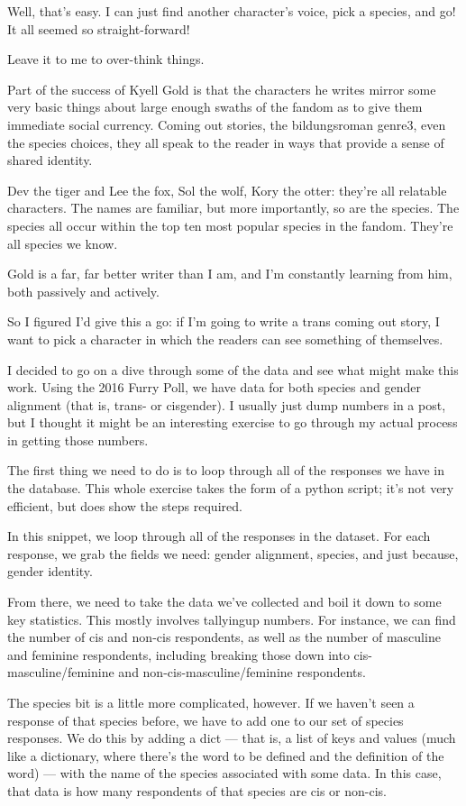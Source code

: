 Well, that's easy. I can just find another character's voice, pick a species, and go! It all seemed so straight-forward!

Leave it to me to over-think things.

Part of the success of Kyell Gold is that the characters he writes mirror some very basic things about large enough swaths of the fandom as to give them immediate social currency. Coming out stories, the bildungsroman genre3, even the species choices, they all speak to the reader in ways that provide a sense of shared identity.

Dev the tiger and Lee the fox, Sol the wolf, Kory the otter: they're all relatable characters. The names are familiar, but more importantly, so are the species. The species all occur within the top ten most popular species in the fandom. They're all species we know.

Gold is a far, far better writer than I am, and I'm constantly learning from him, both passively and actively.

So I figured I'd give this a go: if I'm going to write a trans coming out story, I want to pick a character in which the readers can see something of themselves.

I decided to go on a dive through some of the data and see what might make this work. Using the 2016 Furry Poll, we have data for both species and gender alignment (that is, trans- or cisgender). I usually just dump numbers in a post, but I thought it might be an interesting exercise to go through my actual process in getting those numbers.

The first thing we need to do is to loop through all of the responses we have in the database. This whole exercise takes the form of a python script; it's not very efficient, but does show the steps required.

In this snippet, we loop through all of the responses in the dataset. For each response, we grab the fields we need: gender alignment, species, and just because, gender identity.

From there, we need to take the data we've collected and boil it down to some key statistics. This mostly involves tallyingup numbers. For instance, we can find the number of cis and non-cis respondents, as well as the number of masculine and feminine respondents, including breaking those down into cis-masculine/feminine and non-cis-masculine/feminine respondents.

The species bit is a little more complicated, however. If we haven't seen a response of that species before, we have to add one to our set of species responses. We do this by adding a dict --- that is, a list of keys and values (much like a dictionary, where there's the word to be defined and the definition of the word) --- with the name of the species associated with some data. In this case, that data is how many respondents of that species are cis or non-cis.

